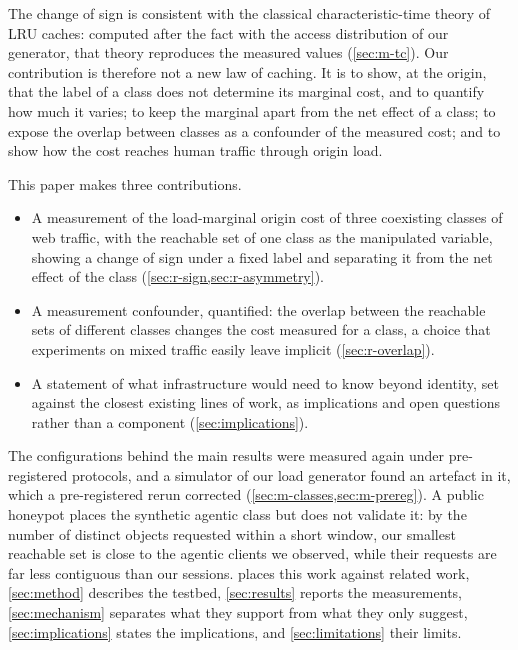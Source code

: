 The change of sign is consistent with the classical characteristic-time theory of LRU
caches: computed after the fact with the access distribution of our generator, that theory
reproduces the measured values (\cref{sec:m-tc}).
Our contribution is therefore not a new law of caching.
It is to show, at the origin, that the label of a class does not determine its marginal
cost, and to quantify how much it varies; to keep the marginal apart from the net effect of
a class; to expose the overlap between classes as a confounder of the measured cost; and to
show how the cost reaches human traffic through origin load.

This paper makes three contributions.
\begin{itemize}
\item A measurement of the load-marginal origin cost of three coexisting classes of web
  traffic, with the reachable set of one class as the manipulated variable, showing a
  change of sign under a fixed label and separating it from the net effect of the class
  (\cref{sec:r-sign,sec:r-asymmetry}).
\item A measurement confounder, quantified: the overlap between the reachable sets of
  different classes changes the cost measured for a class, a choice that experiments on
  mixed traffic easily leave implicit (\cref{sec:r-overlap}).
\item A statement of what infrastructure would need to know beyond identity, set against
  the closest existing lines of work, as implications and open questions rather than a
  component (\cref{sec:implications}).
\end{itemize}

The configurations behind the main results were measured again under pre-registered
protocols, and a simulator of our load generator found an artefact in it, which a
pre-registered rerun corrected (\cref{sec:m-classes,sec:m-prereg}).
A public honeypot places the synthetic agentic class but does not validate it: by the
number of distinct objects requested within a short window, our smallest reachable set is
close to the agentic clients we observed, while their requests are far less contiguous
than our sessions.
 places this work against related work, \cref{sec:method} describes the
testbed, \cref{sec:results} reports the measurements, \cref{sec:mechanism} separates what
they support from what they only suggest, \cref{sec:implications} states the implications,
and \cref{sec:limitations} their limits.
